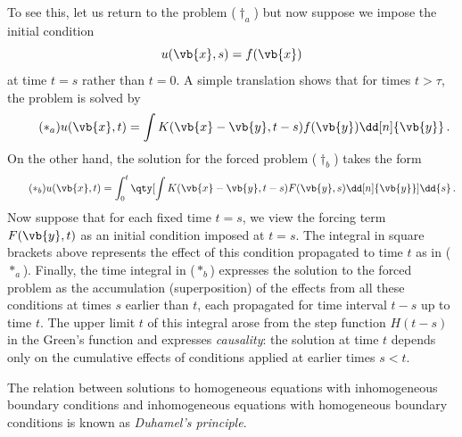 \documentclass{article}
\theoremstyle{plain}\theoremheaderfont{\normalfont\itshape}\theorembodyfont{\rmfamily}\theoremseparator{.}\newtheorem*{rem}{Remark}\newtheorem*{ex}{Example}\newtheorem*{proof}{Proof}\newtheorem*{altp}{Alternative proof}
\theoremstyle{plain}\theoremheaderfont{\normalfont\bfseries}\theorembodyfont{\rmfamily}\theoremseparator{.}\newtheorem{thm}{Theorem}[section]\newtheorem{lem}[thm]{Lemma}\newtheorem{prop}[thm]{Proposition}\newtheorem*{cor}{Corollary}\newtheorem{defn}[thm]{Definition}\newtheorem{clm}[thm]{Claim}\newtheorem{clminproof}{Claim}
\theoremstyle{break}\theoremheaderfont{\normalfont\itshape}\theorembodyfont{\rmfamily}\theoremseparator{.\medskip}\newtheorem*{proofskip}{Proof}\newtheorem*{exs}{Examples}\newtheorem*{rems}{Remarks}
\theoremstyle{break}\theoremheaderfont{\normalfont\bfseries}\theorembodyfont{\rmfamily}\theoremseparator{.\medskip}\newtheorem{lemskip}[thm]{Lemma}\newtheorem{defnskip}[thm]{Definition}\newtheorem{propskip}[thm]{Proposition}\newtheorem{thmskip}[thm]{Theorem}
\numberwithin{equation}{section}
\begin{document}
	To see this, let us return to the problem (\(\dagger_a\)) but now suppose we impose the initial condition
	\[u(\vb{x},s)=f(\vb{x})\]
	at time \(t=s\) rather than \(t=0\). A simple translation shows that for times \(t>\tau\), the problem is solved by
	\begin{equation}\tag{\(*_a\)}
		u(\vb{x},t)=\int K(\vb{x}-\vb{y},t-s)f(\vb{y})\dd[n]{\vb{y}}\,.
	\end{equation}
	On the other hand, the solution for the forced problem (\(\dagger_b\)) takes the form
	\begin{equation}\tag{\(*_b\)}
		u(\vb{x},t)=\int_{0}^{t}\qty[\int K(\vb{x}-\vb{y},t-s)F(\vb{y},s)\dd[n]{\vb{y}}]\dd{s}\,.
	\end{equation}
	Now suppose that for each fixed time \(t=s\), we view the forcing term \(F(\vb{y}, t)\) as an initial condition imposed at \(t=s\). The integral in square brackets above represents the effect of this condition propagated to time \(t\) as in (\(*_a\)). Finally, the time integral in (\(*_b\)) expresses the solution to the forced problem as the accumulation (superposition) of the effects from all these conditions at times \(s\) earlier than \(t\), each propagated for time interval \(t-s\) up to time \(t\). The upper limit \(t\) of this integral arose from the step function \(H(t-s)\) in the Green's function and expresses \textit{causality}: the solution at time \(t\) depends only on the cumulative effects of conditions applied at earlier times \(s<t\).

	The relation between solutions to homogeneous equations with inhomogeneous boundary conditions and inhomogeneous equations with homogeneous boundary conditions is known as \textit{Duhamel's principle}.
\end{document}
